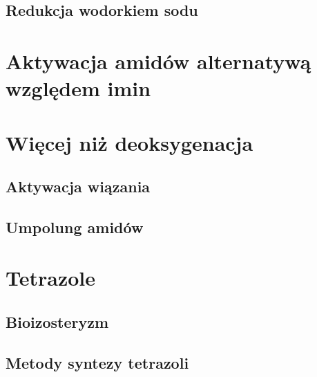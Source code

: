 \subsection{Redukcja wodorkiem sodu}

\section{Aktywacja amidów alternatywą względem imin}

\section{Więcej niż deoksygenacja}
\subsection{Aktywacja wiązania }
\subsection{Umpolung amidów}

\section{Tetrazole}
\subsection{Bioizosteryzm}
\subsection{Metody syntezy tetrazoli}

